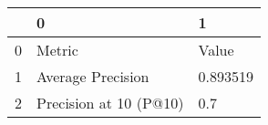 \begin{tabular}{lll}
\toprule
{} &                       0 &         1 \\
\midrule
0 &                  Metric &     Value \\
1 &       Average Precision &  0.893519 \\
2 &  Precision at 10 (P@10) &       0.7 \\
\bottomrule
\end{tabular}
